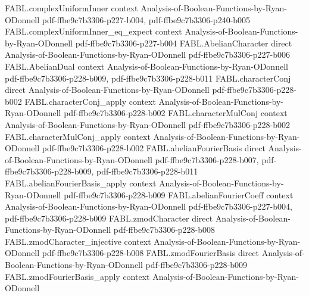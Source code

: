 \begin{theorem}
\label{FABL.abelianFourierCoeff_convolution}
\leanok
{}
\proofstep
  {FABL.complexUniformInner}
  {context}
  {Analysis-of-Boolean-Functions-by-Ryan-ODonnell}
  {pdf-ffbe9c7b3306-p227-b004,
    pdf-ffbe9c7b3306-p240-b005}
\proofstep
  {FABL.complexUniformInner_eq_expect}
  {context}
  {Analysis-of-Boolean-Functions-by-Ryan-ODonnell}
  {pdf-ffbe9c7b3306-p227-b004}
\proofstep
  {FABL.AbelianCharacter}
  {direct}
  {Analysis-of-Boolean-Functions-by-Ryan-ODonnell}
  {pdf-ffbe9c7b3306-p227-b006}
\proofstep
  {FABL.AbelianDual}
  {context}
  {Analysis-of-Boolean-Functions-by-Ryan-ODonnell}
  {pdf-ffbe9c7b3306-p228-b009,
    pdf-ffbe9c7b3306-p228-b011}
\proofstep
  {FABL.characterConj}
  {direct}
  {Analysis-of-Boolean-Functions-by-Ryan-ODonnell}
  {pdf-ffbe9c7b3306-p228-b002}
\proofstep
  {FABL.characterConj_apply}
  {context}
  {Analysis-of-Boolean-Functions-by-Ryan-ODonnell}
  {pdf-ffbe9c7b3306-p228-b002}
\proofstep
  {FABL.characterMulConj}
  {context}
  {Analysis-of-Boolean-Functions-by-Ryan-ODonnell}
  {pdf-ffbe9c7b3306-p228-b002}
\proofstep
  {FABL.characterMulConj_apply}
  {context}
  {Analysis-of-Boolean-Functions-by-Ryan-ODonnell}
  {pdf-ffbe9c7b3306-p228-b002}
\proofstep
  {FABL.abelianFourierBasis}
  {direct}
  {Analysis-of-Boolean-Functions-by-Ryan-ODonnell}
  {pdf-ffbe9c7b3306-p228-b007,
    pdf-ffbe9c7b3306-p228-b009,
    pdf-ffbe9c7b3306-p228-b011}
\proofstep
  {FABL.abelianFourierBasis_apply}
  {context}
  {Analysis-of-Boolean-Functions-by-Ryan-ODonnell}
  {pdf-ffbe9c7b3306-p228-b009}
\proofstep
  {FABL.abelianFourierCoeff}
  {context}
  {Analysis-of-Boolean-Functions-by-Ryan-ODonnell}
  {pdf-ffbe9c7b3306-p227-b004,
    pdf-ffbe9c7b3306-p228-b009}
\proofstep
  {FABL.zmodCharacter}
  {direct}
  {Analysis-of-Boolean-Functions-by-Ryan-ODonnell}
  {pdf-ffbe9c7b3306-p228-b008}
\proofstep
  {FABL.zmodCharacter_injective}
  {context}
  {Analysis-of-Boolean-Functions-by-Ryan-ODonnell}
  {pdf-ffbe9c7b3306-p228-b008}
\proofstep
  {FABL.zmodFourierBasis}
  {direct}
  {Analysis-of-Boolean-Functions-by-Ryan-ODonnell}
  {pdf-ffbe9c7b3306-p228-b009}
\proofstep
  {FABL.zmodFourierBasis_apply}
  {context}
  {Analysis-of-Boolean-Functions-by-Ryan-ODonnell}

\end{theorem}
